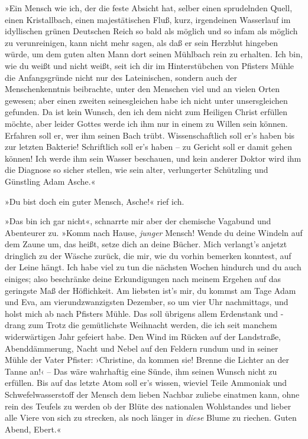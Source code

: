 »Ein Mensch wie ich, der die feste Absicht hat, selber einen
sprudelnden Quell, einen Kristallbach, einen majestätischen Fluß,
kurz, irgendeinen Wasserlauf im idyllischen grünen Deutschen Reich
so bald als möglich und so infam als möglich zu verunreinigen, kann
nicht mehr sagen, als daß er sein Herzblut hingeben würde, um dem
guten alten Mann dort seinen Mühlbach rein zu erhalten. Ich bin,
wie du weißt und nicht weißt, seit ich dir im Hinterstübchen von
Pfisters Mühle die Anfangsgründe nicht nur des Lateinischen,
sondern auch der Menschenkenntnis beibrachte, unter den Menschen
viel und an vielen Orten gewesen; aber einen zweiten seinesgleichen
habe ich nicht unter unsersgleichen gefunden. Da ist kein Wunsch,
den ich dem nicht zum Heiligen Christ erfüllen möchte, aber leider
Gottes werde ich ihm nur in einem zu Willen sein können. Erfahren
soll er, wer ihm seinen Bach trübt. Wissenschaftlich soll er's
haben bis zur letzten Bakterie! Schriftlich soll er's haben – zu
Gericht soll er damit gehen können! Ich werde ihm sein Wasser
beschauen, und kein anderer Doktor wird ihm die Diagnose so sicher
stellen, wie sein alter, verlungerter Schützling und Günstling Adam
Asche.«

»Du bist doch ein guter Mensch, Asche!« rief ich.

»Das bin ich gar nicht«, schnarrte mir aber der chemische Vagabund
und Abenteurer zu. »Komm nach Hause, \emph{junger} Mensch! Wende du
deine Windeln auf dem Zaune um, das heißt, setze dich an deine
Bücher. Mich verlangt's anjetzt dringlich zu der Wäsche zurück, die
mir, wie du vorhin bemerken konntest, auf der Leine hängt. Ich habe
viel zu tun die nächsten Wochen hindurch und du auch einiges; also
beschränke deine Erkundigungen nach meinem Ergehen auf das
geringste Maß der Höflichkeit. Am liebsten ist's mir, du kommst am
Tage Adam und Eva, am vierundzwanzigsten Dezember, so um vier Uhr
nachmittags, und holst mich ab nach Pfisters Mühle. Das soll
übrigens allem Erdenstank und -drang zum Trotz die gemütlichste
Weihnacht werden, die ich seit manchem widerwärtigen Jahr gefeiert
habe. Den Wind im Rücken auf der Landstraße, Abenddämmerung, Nacht
und Nebel auf den Feldern rundum und in seiner Mühle der Vater
Pfister: ›Christine, da kommen sie! Brenne die Lichter an der Tanne
an!‹ – Das wäre wahrhaftig eine Sünde, ihm seinen Wunsch nicht zu
erfüllen. Bis auf das letzte Atom soll er's wissen, wieviel Teile
Ammoniak und Schwefelwasserstoff der Mensch dem lieben Nachbar
zuliebe einatmen kann, ohne rein des Teufels zu werden ob der Blüte
des nationalen Wohlstandes und lieber alle Viere von sich zu
strecken, als noch länger in \emph{diese} Blume zu riechen. Guten
Abend, Ebert.«

